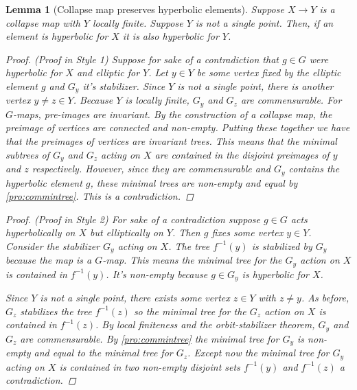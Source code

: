 \documentclass[12pt,parskip=full]{report}
\theoremstyle{plain}
\newtheorem{lem}[thm]{Lemma}
\theoremstyle{definition}
\begin{document}
\begin{lem}
    [Collapse map preserves hyperbolic elements]
    \label{lem:preservehyperbolicity}
    Suppose \(X \to Y\) is a collapse map with \(Y\) locally finite. Suppose \(Y\) is not a single point. Then, if an element is hyperbolic for \(X\) it is also hyperbolic for \(Y\).
    \begin{proof}
        (Proof in Style 1)
        Suppose for sake of a contradiction that \(g\in G\) were hyperbolic for \(X\) and elliptic for \(Y\). Let \(y \in Y\) be some vertex fixed by the elliptic element \(g\) and \(G_y\) it's stabilizer. Since \(Y\) is not a single point, there is another vertex \(y\neq z \in Y\). Because \(Y\) is locally finite, \(G_y\) and \(G_z\) are commensurable. For \(G\)-maps, pre-images are invariant. By the construction of a collapse map, the preimage of vertices are connected and non-empty. Putting these together we have that the preimages of vertices are invariant trees. This means that the minimal subtrees of \(G_y\) and \(G_z\) acting on \(X\) are contained in the disjoint preimages of \(y\) and \(z\) respectively. However, since they are commensurable and \(G_y\) contains the hyperbolic element \(g\), these minimal trees are non-empty and equal by \ref{pro:commintree}. This is a contradiction.
    \end{proof}
    \begin{proof}
        (Proof in Style 2)
        For sake of a contradiction suppose $g\in G$ acts hyperbolically on $X$ but elliptically on $Y$.  Then $g$ fixes some vertex $y\in Y$.  Consider the stabilizer $G_y$ acting on $X$. The tree $f^{-1}(y)$ is stabilized by $G_y$ because the map is a $G$-map. This means the minimal tree for the $G_y$ action on $X$ is contained in $f^{-1}(y)$. It's non-empty because $g\in G_y$ is hyperbolic for $X$.
        
        
        Since $Y$ is not a single point, there exists some vertex $z\in Y$ with $z\neq y$. As before, $G_z$ stabilizes the tree $f^{-1}(z)$ so the minimal tree for the $G_z$ action on $X$ is contained in $f^{-1}(z)$. By local finiteness and the orbit-stabilizer theorem, $G_y$ and $G_z$ are commensurable. By \ref{pro:commintree} the minimal tree for $G_y$ is non-empty and equal to the minimal tree for $G_z$. Except now the minimal tree for $G_y$ acting on $X$ is contained in two non-empty disjoint sets $f^{-1}(y)$ and $f^{-1}(z)$ a contradiction.
    \end{proof}
\end{lem}
\end{document}
